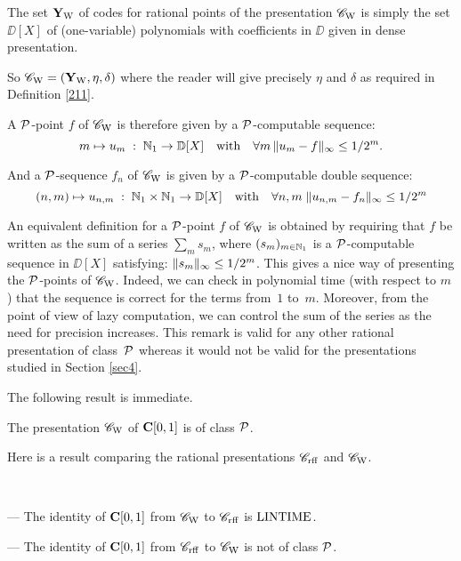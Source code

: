 The set ${{\bf Y}_{\rm W}}$ of codes for rational points of the presentation ${{{\mathscr C}}_{\rm W}}$ is simply the set $\DD[X]$ of (one-variable) polynomials with coefficients in $\DD$ given in dense presentation.


\smallskip So ${{{\mathscr C}}_{\rm W}}=({{\bf Y}_{\rm W}},\eta,\delta)$ where the reader will give precisely $\eta$ and $\delta$ as required in Definition \ref{211}.

\smallskip A ${\cal P}$-point $f$ of ${{{\mathscr C}}_{\rm W}}$ is therefore given by a ${\cal P}$-computable sequence: 
\[
m \mapsto u_m \; : \; \mathbb {N}_1 \to \mathbb {D}[X] \quad {\rm with }\quad \forall m \, \lVert  u_m - f  \rVert_{\infty} \leq 1/2^m.
\]

And a ${\cal P}$-sequence $f_n$ of ${{{\mathscr C}}_{\rm W}}$ is given by a ${\cal P}$-computable double sequence: 
\[
(n,m) \mapsto u_{n,m} \; : \; \mathbb {N}_1 \times \mathbb {N}_1 \to \mathbb {D}[X] \quad {\rm with }\quad  \forall n,m  \; \lVert  u_{n,m} - f_n  \rVert_{\infty} 
\leq 1/2^m
\]

\begin{remark} \label{511}
An equivalent definition for a ${\cal P}$-point $f$ of ${{{\mathscr C}}_{\rm W}}$ is obtained by requiring that $f$ be written as the sum of a series $\sum_ms_m$, where $(s_m)_{m\in\mathbb {N}_1}$ is a ${\cal P}$-computable sequence in $\DD[X]$ satisfying: 
$\lVert  s_m  \rVert_{\infty} \leq 1/2^m$. 
This gives a nice way of presenting the ${\cal P}$-points of ${{{\mathscr C}}_{\rm W}}$. Indeed, we can check in polynomial time (with respect to $m$) that the sequence is correct for the terms from~$1$ to~$m$. Moreover, from the point of view of lazy computation, we can control the sum of the series as the need for precision increases. This remark is valid for any other rational presentation of class~${\cal P}$ whereas it would not be valid for the presentations studied in Section \ref{sec4}.
\end{remark}

The following result is immediate.

\begin{proposition} \label{512}
The presentation ${{{\mathscr C}}_{\rm W}}$ of ${{\bf C}[0,1]}$ is of class ${\cal P}$.
\end{proposition}


\smallskip Here is a result comparing the rational presentations ${{{\mathscr C}}_{\rm rff}}$ and ${{{\mathscr C}}_{\rm W}}$. 


\begin{proposition} \label{513}~

\noindent 
--- The identity of ${{\bf C}[0,1]}$ from ${{{\mathscr C}}_{\rm W}}$ to ${{{\mathscr C}}_{\rm rff}}$ is ${\rm LINTIME}$.

\noindent 
--- The identity of ${{\bf C}[0,1]}$ from ${{{\mathscr C}}_{\rm rff}}$ to ${{{\mathscr C}}_{\rm W}}$ is not of class ${\cal P}$.
\end{proposition}

